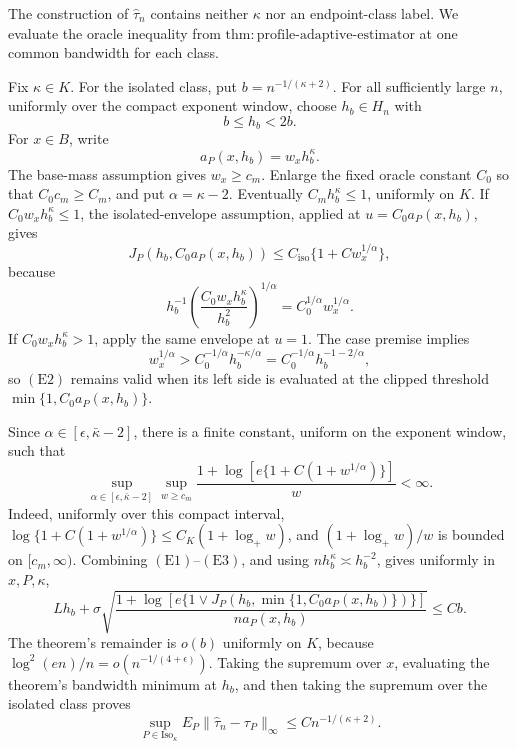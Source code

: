 The construction of \(\widehat\tau_n\) contains neither \(\kappa\) nor an
endpoint-class label.  We evaluate the oracle inequality from
\(\mathrm{thm{:}profile\text{-}adaptive\text{-}estimator}\) at one common
bandwidth for each class.

Fix \(\kappa\in K\).  For the isolated class, put
\(b=n^{-1/(\kappa+2)}\).  For all sufficiently large \(n\), uniformly over
the compact exponent window, choose \(h_b\in H_n\) with
\[
 b\leq h_b<2b.
 \tag{E1}
\]
For \(x\in B\), write
\[
 a_P(x,h_b)=w_xh_b^\kappa.
\]
The base-mass assumption gives \(w_x\geq c_m\).  Enlarge the fixed oracle
constant \(C_0\) so that \(C_0c_m\geq C_m\), and put
\(\alpha=\kappa-2\).  Eventually \(C_mh_b^\kappa\leq1\), uniformly on
\(K\).  If \(C_0w_xh_b^\kappa\leq1\), the isolated-envelope assumption,
applied at \(u=C_0a_P(x,h_b)\), gives
\[
 J_P(h_b,C_0a_P(x,h_b))
 \leq C_{\mathrm{iso}}\{1+Cw_x^{1/\alpha}\},
 \tag{E2}
\]
because
\[
 h_b^{-1}\left(\frac{C_0w_xh_b^\kappa}{h_b^2}\right)^{1/\alpha}
 =C_0^{1/\alpha}w_x^{1/\alpha}.
\]
If \(C_0w_xh_b^\kappa>1\), apply the same envelope at \(u=1\).  The case
premise implies
\[
 w_x^{1/\alpha}>C_0^{-1/\alpha}h_b^{-\kappa/\alpha}
 =C_0^{-1/\alpha}h_b^{-1-2/\alpha},
\]
so \((\mathrm{E2})\) remains valid when its left side is evaluated at the
clipped threshold \(\min\{1,C_0a_P(x,h_b)\}\).

Since \(\alpha\in[\epsilon,\bar\kappa-2]\), there is a finite constant,
uniform on the exponent window, such that
\[
 \sup_{\alpha\in[\epsilon,\bar\kappa-2]}
 \sup_{w\geq c_m}
 \frac{1+\log[e\{1+C(1+w^{1/\alpha})\}]}{w}<\infty.
 \tag{E3}
\]
Indeed, uniformly over this compact interval,
\(\log\{1+C(1+w^{1/\alpha})\}\leq C_K(1+\log_+w)\), and
\((1+\log_+w)/w\) is bounded on \([c_m,\infty)\).  Combining
\((\mathrm{E1})\)--\((\mathrm{E3})\), and using
\(nh_b^\kappa\asymp h_b^{-2}\), gives uniformly in \(x,P,\kappa\),
\[
 Lh_b+\sigma\sqrt{
 \frac{1+\log[e\{1\vee
 J_P(h_b,\min\{1,C_0a_P(x,h_b)\})\}]}
 {na_P(x,h_b)}}
 \leq Cb.
 \tag{E4}
\]
The theorem's remainder is \(o(b)\) uniformly on \(K\), because
\(\log^2(en)/n=o(n^{-1/(4+\epsilon)})\).  Taking the supremum over
\(x\), evaluating the theorem's bandwidth minimum at \(h_b\), and then
taking the supremum over the isolated class proves
\[
 \sup_{P\in\mathrm{Iso}_\kappa}
 E_P\|\widehat\tau_n-\tau_P\|_\infty
 \leq Cn^{-1/(\kappa+2)}.
 \tag{E5}
\]

